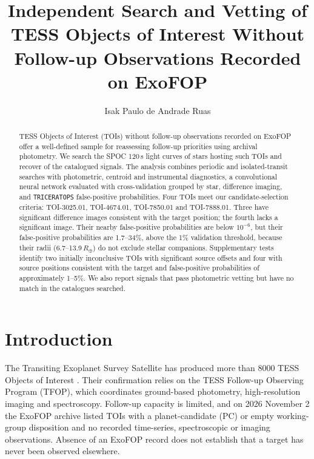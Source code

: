 \documentclass{aastex701}
\begin{document}
\title{Independent Search and Vetting of TESS Objects of Interest Without Follow-up Observations Recorded on ExoFOP}

\author[0000-0002-3986-8048]{Isak Paulo de Andrade Ruas}

\begin{abstract}
TESS Objects of Interest (TOIs) without follow-up observations recorded on ExoFOP offer a
well-defined sample for reassessing follow-up priorities using archival photometry. We search
the SPOC 120\,s light curves of \nStars{} stars hosting \nOpen{} such TOIs and recover
\nRecovered{} of the catalogued signals. The analysis combines periodic and isolated-transit
searches with photometric, centroid and instrumental diagnostics, a convolutional neural network
evaluated with cross-validation grouped by star, difference imaging, and \texttt{TRICERATOPS}
false-positive probabilities. Four TOIs meet our candidate-selection criteria: TOI-3025.01,
TOI-4674.01, TOI-7850.01 and TOI-7888.01. Three have significant difference images consistent
with the target position; the fourth lacks a significant image. Their nearby false-positive
probabilities are below $10^{-6}$, but their false-positive probabilities are 1.7--34\%, above
the 1\% validation threshold, because their radii (6.7--13.9\,$R_\oplus$) do not exclude
stellar companions. Supplementary tests identify two initially inconclusive TOIs with
significant source offsets and four with source positions consistent with the target and
false-positive probabilities of approximately 1--5\%. We also report \nNew{} signals that pass
photometric vetting but have no match in the catalogues searched.
\end{abstract}


\section{Introduction}\label{sec:intro}

The Transiting Exoplanet Survey Satellite \citep[TESS;][]{Ricker2015} has produced more than 8000
TESS Objects of Interest \citep[TOIs;][]{Guerrero2021}. Their confirmation relies on the TESS
Follow-up Observing Program (TFOP), which coordinates ground-based photometry, high-resolution
imaging and spectroscopy. Follow-up capacity is limited, and on 2026 November 2 the ExoFOP archive
listed \nOpenAll{} TOIs with a planet-candidate (PC) or empty working-group disposition and no
recorded time-series, spectroscopic or imaging observations. Absence of an ExoFOP record does not
establish that a target has never been observed elsewhere.
\end{document}
